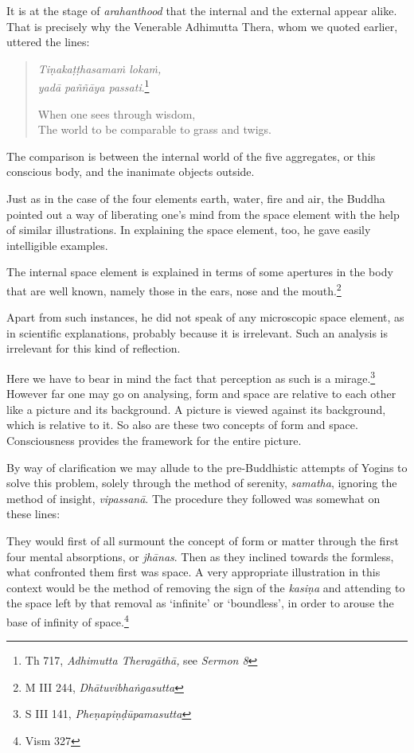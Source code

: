 It is at the stage of \emph{arahanthood} that the internal and the external appear alike. That is precisely why the Venerable Adhimutta Thera, whom we quoted earlier, uttered the lines:

\begin{quote}
\emph{Tiṇakaṭṭhasamaṁ lokaṁ,}\\
\emph{yadā paññāya passati}.\footnote{Th 717, \emph{Adhimutta Theragāthā,} see \emph{Sermon 8}}

When one sees through wisdom,\\
The world to be comparable to grass and twigs.
\end{quote}

The comparison is between the internal world of the five aggregates, or this conscious body, and the inanimate objects outside.

Just as in the case of the four elements earth, water, fire and air, the Buddha pointed out a way of liberating one's mind from the space element with the help of similar illustrations. In explaining the space element, too, he gave easily intelligible examples.

The internal space element is explained in terms of some apertures in the body that are well known, namely those in the ears, nose and the mouth.\footnote{M III 244, \emph{Dhātuvibhaṅgasutta}}

Apart from such instances, he did not speak of any microscopic space element, as in scientific explanations, probably because it is irrelevant. Such an analysis is irrelevant for this kind of reflection.

Here we have to bear in mind the fact that perception as such is a mirage.\footnote{S III 141, \emph{Pheṇapiṇḍūpamasutta}} However far one may go on analysing, form and space are relative to each other like a picture and its background. A picture is viewed against its background, which is relative to it. So also are these two concepts of form and space. Consciousness provides the framework for the entire picture.

By way of clarification we may allude to the pre-Buddhistic attempts of Yogins to solve this problem, solely through the method of serenity, \emph{samatha}, ignoring the method of insight, \emph{vipassanā}. The procedure they followed was somewhat on these lines:

They would first of all surmount the concept of form or matter through the first four mental absorptions, or \emph{jhānas}. Then as they inclined towards the formless, what confronted them first was space. A very appropriate illustration in this context would be the method of removing the sign of the \emph{kasiṇa} and attending to the space left by that removal as `infinite' or `boundless', in order to arouse the base of infinity of space.\footnote{Vism 327}

